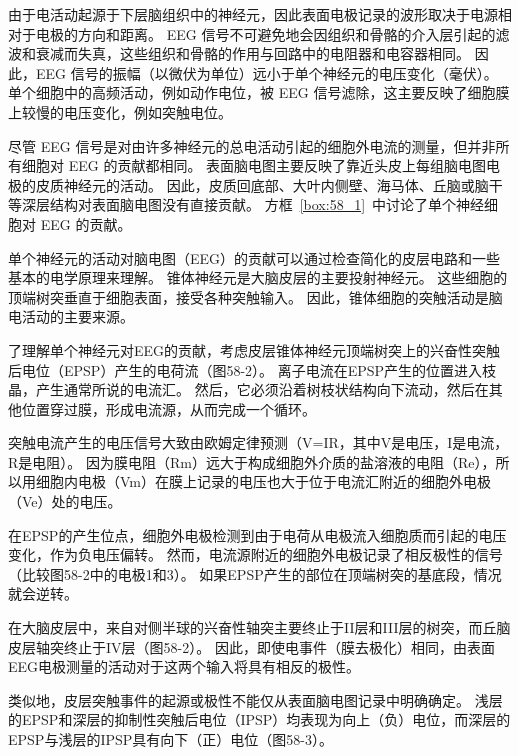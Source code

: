 由于电活动起源于下层脑组织中的神经元，因此表面电极记录的波形取决于电源相对于电极的方向和距离。
EEG 信号不可避免地会因组织和骨骼的介入层引起的滤波和衰减而失真，这些组织和骨骼的作用与回路中的电阻器和电容器相同。
因此，EEG 信号的振幅（以微伏为单位）远小于单个神经元的电压变化（毫伏）。
单个细胞中的高频活动，例如动作电位，被 EEG 信号滤除，这主要反映了细胞膜上较慢的电压变化，例如突触电位。


尽管 EEG 信号是对由许多神经元的总电活动引起的细胞外电流的测量，但并非所有细胞对 EEG 的贡献都相同。
表面脑电图主要反映了靠近头皮上每组脑电图电极的皮质神经元的活动。
因此，皮质回底部、大叶内侧壁、海马体、丘脑或脑干等深层结构对表面脑电图没有直接贡献。
方框~\ref{box:58_1}~中讨论了单个神经细胞对 EEG 的贡献。


\begin{proposition}[单个神经元对脑电图的贡献] \label{box:58_1}
	
	\quad \quad 单个神经元的活动对脑电图（EEG）的贡献可以通过检查简化的皮层电路和一些基本的电学原理来理解。
	锥体神经元是大脑皮层的主要投射神经元。
	这些细胞的顶端树突垂直于细胞表面，接受各种突触输入。
	因此，锥体细胞的突触活动是脑电活动的主要来源。
	
	了理解单个神经元对EEG的贡献，考虑皮层锥体神经元顶端树突上的兴奋性突触后电位（EPSP）产生的电荷流（图58-2）。
	离子电流在EPSP产生的位置进入枝晶，产生通常所说的电流汇。
	然后，它必须沿着树枝状结构向下流动，然后在其他位置穿过膜，形成电流源，从而完成一个循环。
	
	突触电流产生的电压信号大致由欧姆定律预测（V=IR，其中V是电压，I是电流，R是电阻）。
	因为膜电阻（Rm）远大于构成细胞外介质的盐溶液的电阻（Re），所以用细胞内电极（Vm）在膜上记录的电压也大于位于电流汇附近的细胞外电极（Ve）处的电压。
	
	在EPSP的产生位点，细胞外电极检测到由于电荷从电极流入细胞质而引起的电压变化，作为负电压偏转。
	然而，电流源附近的细胞外电极记录了相反极性的信号（比较图58-2中的电极1和3）。
	如果EPSP产生的部位在顶端树突的基底段，情况就会逆转。
	
	在大脑皮层中，来自对侧半球的兴奋性轴突主要终止于II层和III层的树突，而丘脑皮层轴突终止于IV层（图58-2）。
	因此，即使电事件（膜去极化）相同，由表面EEG电极测量的活动对于这两个输入将具有相反的极性。
	
	类似地，皮层突触事件的起源或极性不能仅从表面脑电图记录中明确确定。
	浅层的EPSP和深层的抑制性突触后电位（IPSP）均表现为向上（负）电位，而深层的EPSP与浅层的IPSP具有向下（正）电位（图58-3）。
	
\end{proposition}


